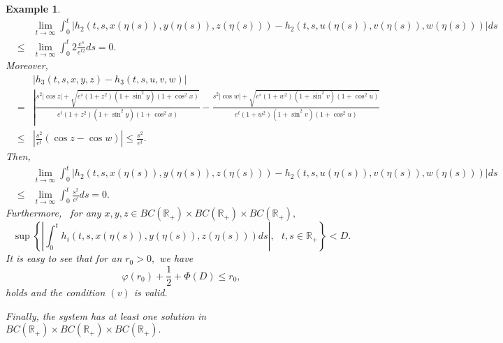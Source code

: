 \documentclass{amsart}
\theoremstyle{plain}
\newtheorem{example}{Example}
\numberwithin{equation}{section}
\begin{document}
\begin{example}
\begin{eqnarray*}
&&\lim_{t\rightarrow \infty }\int_{0}^{t}\left\vert h_{2}\left( t,s,x\left(
\eta \left( s\right) \right) ,y\left( \eta \left( s\right) \right) ,z\left(
\eta \left( s\right) \right) \right) -h_{2}\left( t,s,u\left( \eta \left(
s\right) \right) ,v\left( \eta \left( s\right) \right) ,w\left( \eta \left(
s\right) \right) \right) \right\vert ds \\
&\leqslant &\lim_{t\rightarrow \infty }\int_{0}^{t}2\frac{e^{s}}{e^{t2}}ds=0.
\end{eqnarray*}Moreover,\begin{eqnarray*}
&&\left\vert h_{3}\left( t,s,x,y,z\right) -h_{3}\left( t,s,u,v,w\right)
\right\vert \\
&=&\left\vert \frac{s^{2}\left\vert \cos z\right\vert +\sqrt{e^{s}\left(
1+z^{2}\right) \left( 1+\sin ^{2}y\right) \left( 1+\cos ^{2}x\right) }}{e^{t}\left( 1+z^{2}\right) \left( 1+\sin ^{2}y\right) \left( 1+\cos
^{2}x\right) }-\frac{s^{2}\left\vert \cos w\right\vert +\sqrt{e^{s}\left(
1+w^{2}\right) \left( 1+\sin ^{2}v\right) \left( 1+\cos ^{2}u\right) }}{e^{t}\left( 1+w^{2}\right) \left( 1+\sin ^{2}v\right) \left( 1+\cos
^{2}u\right) }\right. \\
&\leqslant &\left\vert \frac{s^{2}}{e^{t}}\left( \cos z-\cos w\right)
\right\vert \leqslant \frac{s^{2}}{e^{t}}.
\end{eqnarray*}Then,\begin{eqnarray*}
&&\lim_{t\rightarrow \infty }\int_{0}^{t}\left\vert h_{2}\left( t,s,x\left(
\eta \left( s\right) \right) ,y\left( \eta \left( s\right) \right) ,z\left(
\eta \left( s\right) \right) \right) -h_{2}\left( t,s,u\left( \eta \left(
s\right) \right) ,v\left( \eta \left( s\right) \right) ,w\left( \eta \left(
s\right) \right) \right) \right\vert ds \\
&\leqslant &\lim_{t\rightarrow \infty }\int_{0}^{t}\frac{s^{2}}{e^{t}}ds=0.
\end{eqnarray*}Furthermore, \ for any $x,y,z\in BC\left( \mathbb{R}_{+}\right) \times
BC\left( \mathbb{R}_{+}\right) \times BC\left( \mathbb{R}_{+}\right) ,$\begin{equation*}
\sup \left\{ \left\vert \int_{0}^{t}h_{i}\left( t,s,x\left( \eta \left(
s\right) \right) ,y\left( \eta \left( s\right) \right) ,z\left( \eta \left(
s\right) \right) \right) ds\right\vert ,\text{ }t,s\in \mathbb{R}_{+}\right\} <D.
\end{equation*}It is easy to see that for an $r_{0}>0,$ we have\begin{equation*}
\varphi \left( r_{0}\right) +\frac{1}{2}+\Phi \left( D\right) \leqslant
r_{0},
\end{equation*}holds and the condition $\left( v\right) $ is valid.

Finally, the system has at least one solution in $BC\left( \mathbb{R}_{+}\right) \times BC\left( \mathbb{R}_{+}\right) \times BC\left( \mathbb{R}_{+}\right) .$
\end{example}
\end{document}
